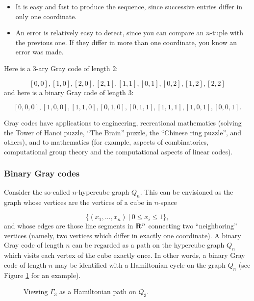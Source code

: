 \begin{itemize}
\item
It is easy and fast to produce the sequence, since
successive entries differ in only one coordinate.

\item
An error is relatively easy to detect, since you can
compare an $n$-tuple with the previous one. If they
differ in more than one coordinate, you know an error
was made.

\end{itemize}

\begin{example}
{\rm
Here is a $3$-ary Gray code of length $2$:

\[
[0, 0], [1, 0], [2, 0], [2, 1], [1, 1], [0, 1], [0, 2], [1, 2], [2, 2]
\]
and here is a binary Gray code of length $3$:

\[
[0, 0, 0], [1, 0, 0], [1, 1, 0], [0, 1, 0], [0, 1, 1], [1, 1, 1], [1, 0, 1], [0, 0, 1].
\]
}
\end{example}

Gray codes have applications to engineering,
recreational mathematics (solving the Tower of Hanoi
puzzle, ``The Brain'' puzzle, the ``Chinese ring puzzle'',
and others), and to mathematics (for example, aspects of
combinatorics, computational group theory
and the computational aspects of linear codes).

\subsubsection{Binary Gray codes}

Consider the so-called $n$-hypercube graph
$Q_n$. This can be envisioned as the graph whose
vertices are the vertices of a cube in
$n$-space

\[
\{(x_1,\dots,x_n)\ |\ 0\leq x_i\leq 1\},
\]
and whose edges are those line segments in
$\mathbf{R}^n$ connecting two ``neighboring''
vertices (namely, two vertices which differ
in exactly one coordinate).
A binary Gray code of length $n$ can be regarded as a
path on the hypercube graph $Q_n$ which visits
each vertex of the cube exactly once.
In other words, a binary Gray code of length $n$
may be identified with a
Hamiltonian cycle on the graph $Q_n$
(see Figure \ref{fig:trees_forests:gray_code_cube} for an example).

\begin{figure}[!htbp]
\centering

\caption{Viewing $\Gamma_3$ as a Hamiltonian path on $Q_3$.}
\label{fig:trees_forests:gray_code_cube}
\end{figure}


